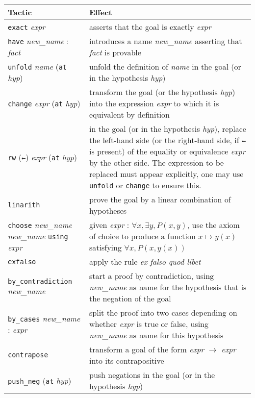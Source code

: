 \documentclass[a4paper]{article}
\newcommand{\lean}[1]{{\tt #1}}
\newcommand{\nv}{\textit{new\_name} }
\newcommand{\nom}{\textit{name} }
\newcommand{\expr}{\textit{expr} }
\newcommand{\fait}{\textit{fact} }
\newcommand{\hyp}{\textit{hyp}\xspace}
\begin{document}
\begin{center}
\setlength\tabcolsep{.5cm}
\def\arraystretch{1.6}
\begin{tabular}{@{}lp{10cm}@{}}
  \toprule
  Tactic & Effect \\
  \midrule
	  \lean{exact} \expr & asserts that the goal is exactly \expr \\
		\lean{have} \nv : \fait & introduces a name \nv asserting that \fait is provable \\
		\lean{unfold} \nom (\lean{at} \hyp) & unfold the definition of \nom in the goal
		(or in the hypothesis \hyp) \\
  \lean{change} \expr (\lean{at} \hyp) & transform the goal (or the hypothesis \hyp)
  into the expression \expr to which it is equivalent by definition \\
		\lean{rw} (\lean{←}) \expr (\lean{at} \hyp) & in the goal (or in the
		hypothesis \hyp), replace the left-hand side
  (or the right-hand side, if \lean{←} is present)
  of the equality or equivalence \expr by the other side.
  The expression to be replaced must appear explicitly,
  one may use \lean{unfold} or \lean{change} to ensure this. \\
		\lean{linarith} & prove the goal by a linear combination of hypotheses \\
		\lean{choose} \nv \nv \lean{using} \expr &
  given \expr : $\forall x, \exists y, P(x, y)$,
  use the axiom of choice to produce a function $x \mapsto y(x)$ satisfying
		$\forall x, P(x, y(x))$\\
		\lean{exfalso} & apply the rule \emph{ex falso quod libet} \\
		\lean{by\_contradiction} \nv & start a proof by contradiction,
  using \nv as name for the hypothesis that is the negation of the goal \\
		\lean{by\_cases} \nv : \expr & split the proof into two cases
  depending on whether \expr is true or false,
  using \nv as name for this hypothesis \\
		\lean{contrapose} & transform a goal of the form \expr $\to$ \expr
  into its contrapositive \\
		\lean{push\_neg} (\lean{at} \hyp) & push negations in the goal
  (or in the hypothesis \hyp) \\
  \bottomrule
\end{tabular}
\end{center}
\end{document}
